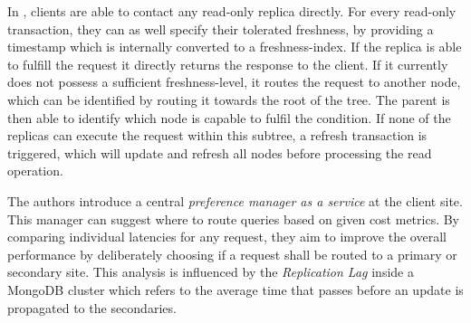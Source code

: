In \cite{voicu:2010}, clients are able to contact any read-only replica directly. For every read-only transaction, they can as well specify
their tolerated freshness, by providing a timestamp which is internally converted to a freshness-index. If the replica is able to fulfill the request 
it directly returns the response to the client. If it currently does not possess a sufficient freshness-level, it routes the request to another node, which can be identified 
by routing it towards the root of the tree. The parent is then able to identify which node is capable to fulfil the condition.  
If none of the replicas can execute the request within this subtree, a refresh transaction is triggered, which will update and refresh all nodes before 
processing the read operation.

The authors \cite{huang:2020} introduce a central \emph{preference manager as a service} at the client site. This manager can suggest where to route queries 
based on given cost metrics. By comparing individual latencies for any request, they aim to improve the overall performance by deliberately choosing if a request 
shall be routed to a primary or secondary site. This analysis is influenced by the \emph{Replication Lag} inside a MongoDB cluster which refers to the average time 
that passes before an update is propagated to the secondaries. 




